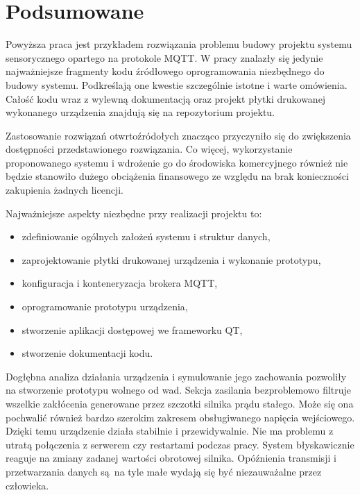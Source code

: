  \chapter{Podsumowane}
  
Powyższa praca jest przykładem rozwiązania problemu budowy projektu systemu sensorycznego opartego na protokole MQTT. W pracy znalazły się jedynie najważniejsze fragmenty kodu źródłowego oprogramowania niezbędnego do budowy systemu. Podkreślają one kwestie szczególnie istotne i warte omówienia. Całość kodu wraz z wylewną dokumentacją oraz projekt płytki drukowanej wykonanego urządzenia znajdują się na repozytorium projektu. 

Zastosowanie rozwiązań otwrtoźródołych znacząco przyczyniło się do zwiększenia dostępności przedstawionego rozwiązania. Co więcej, wykorzystanie proponowanego systemu i wdrożenie go do środowiska komercyjnego również nie będzie stanowiło dużego obciążenia finansowego ze względu na brak konieczności zakupienia żadnych licencji. 

Najważniejsze aspekty niezbędne przy realizacji projektu to:
\begin{itemize}
    \item zdefiniowanie ogólnych założeń systemu i struktur danych, 
    \item zaprojektowanie płytki drukowanej urządzenia i wykonanie prototypu,
    \item konfiguracja i konteneryzacja brokera MQTT,
    \item oprogramowanie prototypu urządzenia,
    \item stworzenie aplikacji dostępowej we frameworku QT,
    \item stworzenie dokumentacji kodu.
\end{itemize}

Dogłębna analiza działania urządzenia i symulowanie jego zachowania pozwoliły na stworzenie prototypu wolnego od wad. Sekcja zasilania bezproblemowo filtruje wszelkie zakłócenia generowane przez szczotki silnika prądu stałego. Może się ona pochwalić również bardzo szerokim zakresem obsługiwanego napięcia wejściowego. Dzięki temu urządzenie działa stabilnie i przewidywalnie. Nie ma problemu z utratą połączenia z serwerem czy restartami podczas pracy. System błyskawicznie reaguje na zmiany zadanej wartości obrotowej silnika. Opóźnienia transmisji i przetwarzania danych są na tyle małe wydają się być niezauważalne przez człowieka. 